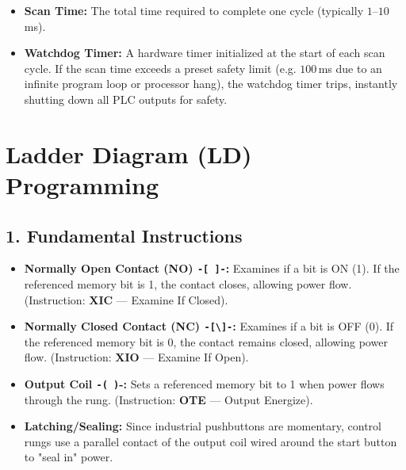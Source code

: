 \documentclass[12pt,a4paper]{article}
\begin{document}
\begin{itemize}[leftmargin=*, itemsep=2.5pt]
  \item \textbf{Scan Time:} The total time required to complete one cycle (typically $1\text{--}10\,$ms).
  \item \textbf{Watchdog Timer:} A hardware timer initialized at the start of each scan cycle. If the scan time exceeds a preset safety limit (e.g. $100\,$ms due to an infinite program loop or processor hang), the watchdog timer trips, instantly shutting down all PLC outputs for safety.
\end{itemize}


\section{Ladder Diagram (LD) Programming}

\subsection{1. Fundamental Instructions}
\begin{itemize}[leftmargin=*, itemsep=2.5pt]
  \item \textbf{Normally Open Contact (NO) \texttt{-[ ]-}:} Examines if a bit is ON (1). If the referenced memory bit is 1, the contact closes, allowing power flow. (Instruction: \textbf{XIC} --- Examine If Closed).
  \item \textbf{Normally Closed Contact (NC) \texttt{-[\textbackslash]-}:} Examines if a bit is OFF (0). If the referenced memory bit is 0, the contact remains closed, allowing power flow. (Instruction: \textbf{XIO} --- Examine If Open).
  \item \textbf{Output Coil \texttt{-( )}-:} Sets a referenced memory bit to 1 when power flows through the rung. (Instruction: \textbf{OTE} --- Output Energize).
  \item \textbf{Latching/Sealing:} Since industrial pushbuttons are momentary, control rungs use a parallel contact of the output coil wired around the start button to "seal in" power.
\end{itemize}
\end{document}
